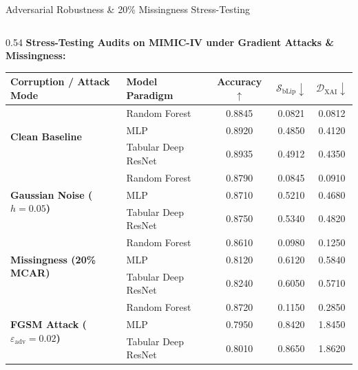 \documentclass[aspectratio=169,10pt]{beamer}
\begin{document}
\begin{frame}{Adversarial Robustness \& 20\% Missingness Stress-Testing}
  \vspace{-0.1cm}
  \begin{columns}[t]
    \begin{column}{0.54\textwidth}
      \textbf{\scriptsize Stress-Testing Audits on MIMIC-IV under Gradient Attacks \& Missingness:}
      \vspace{0.03cm}
      \begin{table}[h]
        \centering
        \setlength{\tabcolsep}{2pt}
        \fontsize{5.5pt}{6.8pt}\selectfont
        \begin{tabular}{llccc}
          \toprule
          \textbf{Corruption / Attack Mode} & \textbf{Model Paradigm} & \textbf{Accuracy $\uparrow$} & \textbf{$\mathcal{S}_{\text{bLip}} \downarrow$} & \textbf{$\mathcal{D}_{\text{XAI}} \downarrow$} \\
          \midrule
          \multirow{3}{*}{\textbf{Clean Baseline}} 
          & Random Forest & 0.8845 & 0.0821 & 0.0812 \\
          & MLP & 0.8920 & 0.4850 & 0.4120 \\
          & Tabular Deep ResNet & 0.8935 & 0.4912 & 0.4350 \\
          \midrule
          \multirow{3}{*}{\textbf{Gaussian Noise ($h=0.05$)}} 
          & Random Forest & 0.8790 & 0.0845 & 0.0910 \\
          & MLP & 0.8710 & 0.5210 & 0.4680 \\
          & Tabular Deep ResNet & 0.8750 & 0.5340 & 0.4820 \\
          \midrule
          \multirow{3}{*}{\textbf{Missingness (20\% MCAR)}} 
          & Random Forest & 0.8610 & 0.0980 & 0.1250 \\
          & MLP & 0.8120 & 0.6120 & 0.5840 \\
          & Tabular Deep ResNet & 0.8240 & 0.6050 & 0.5710 \\
          \midrule
          \multirow{3}{*}{\textbf{FGSM Attack ($\varepsilon_{\text{adv}}=0.02$)}} 
          & Random Forest & 0.8720 & 0.1150 & 0.2850 \\
          & MLP & 0.7950 & 0.8420 & 1.8450 \\
          & Tabular Deep ResNet & 0.8010 & 0.8650 & 1.8620 \\

\end{tabular}
\end{table}
\end{column}
\end{columns}
\end{frame}
\end{document}
